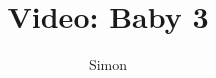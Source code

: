 \documentclass[a4paper,11pt]{article}
\title{Video: Baby 3}
\author{Simon}
\begin{document}
\maketitle

\begin{sketch}


\end{sketch}
\end{document}
